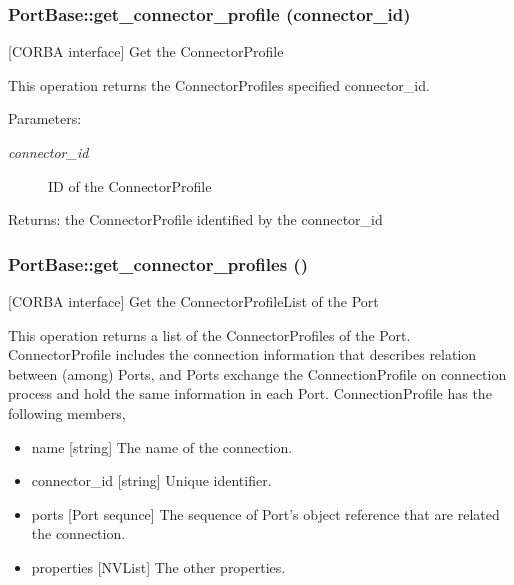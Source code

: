 \subsubsection{\setlength{\rightskip}{0pt plus 5cm}Port\-Base::get\_\-connector\_\-profile (connector\_\-id)}\label{classPortBase_PortBasea4}


[CORBA interface] Get the Connector\-Profile 

This operation returns the Connector\-Profiles specified connector\_\-id.

\begin{Desc}
\item[Parameters:]
\begin{description}
\item[{\em connector\_\-id}]ID of the Connector\-Profile \end{description}
\end{Desc}
\begin{Desc}
\item[Returns:]the Connector\-Profile identified by the connector\_\-id\end{Desc}
\subsubsection{\setlength{\rightskip}{0pt plus 5cm}Port\-Base::get\_\-connector\_\-profiles ()}\label{classPortBase_PortBasea3}


[CORBA interface] Get the Connector\-Profile\-List of the Port 

This operation returns a list of the Connector\-Profiles of the Port. Connector\-Profile includes the connection information that describes relation between (among) Ports, and Ports exchange the Connection\-Profile on connection process and hold the same information in each Port. Connection\-Profile has the following members,

\begin{itemize}
\item name [string] The name of the connection.\item connector\_\-id [string] Unique identifier.\item ports [Port sequnce] The sequence of Port's object reference that are related the connection.\item properties [NVList] The other properties.\end{itemize}


